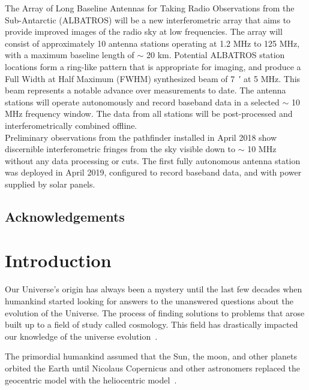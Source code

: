 \documentclass[12pt,a4paper]{report}
\begin{document}
The Array of Long Baseline Antennas for Taking Radio Observations from the Sub-Antarctic (ALBATROS) will be a new interferometric array that aims to provide improved images of the radio sky at low frequencies. The array will consist of approximately 10 antenna stations operating at 1.2 MHz to 125 MHz, with a maximum baseline length of $\sim$ 20 km. Potential ALBATROS station locations form a ring-like pattern that is appropriate for imaging, and produce a Full Width at Half Maximum (FWHM) synthesized beam of \SI{7}{\arcminute} at 5 MHz. This
beam represents a notable advance over measurements to date. The antenna stations will operate autonomously and record baseband data in a selected $ \sim $ 10 MHz frequency window. The data from all stations will be post-processed and interferometrically combined
offline. \\

Preliminary observations from the pathfinder installed in April 2018 show discernible interferometric fringes from the sky visible down to $\sim$ 10 MHz without any data processing or cuts. The first fully autonomous antenna station was deployed in April 2019, configured to record baseband data, and with power supplied by solar panels. 


\newpage
\section*{Acknowledgements}

\newpage
\renewcommand\contentsname{Table of Contents} %
\tableofcontents\newpage %

	


\chapter{Introduction}

	Our Universe’s origin has always been a mystery until the last few decades when humankind started looking for answers to the unanswered questions about the evolution of the Universe. The process of finding solutions to problems that arose built up to a field of study called cosmology. This field has drastically impacted our knowledge of the universe evolution~\citep{book:909085}.
		
	The primordial humankind assumed that the Sun, the moon, and other planets orbited the Earth until Nicolaus Copernicus and other astronomers replaced the geocentric model with the heliocentric model~\citep{2015arXiv150201967R}.
		
\end{document}
